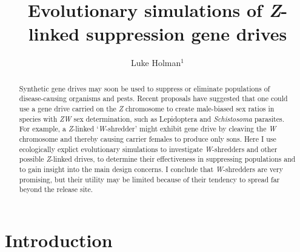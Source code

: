 \documentclass[]{rsos}%
\begin{document}
\title{Evolutionary simulations of \emph{Z}-linked suppression gene drives}

\author{
Luke Holman$^{1}$}

\address{
  $^{1}$School of BioSciences, The University of Melbourne, Victoria 3010,
Australia.}
\subject{
Evolutionary biology,
Theoretical modelling,
Gene drives}



\begin{abstract}
Synthetic gene drives may soon be used to suppress or eliminate
populations of disease-causing organisms and pests. Recent proposals
have suggested that one could use a gene drive carried on the \emph{Z}
chromosome to create male-biased sex ratios in species with \emph{ZW}
sex determination, such as Lepidoptera and \emph{Schistosoma} parasites.
For example, a \emph{Z}-linked `\emph{W}-shredder' might exhibit gene
drive by cleaving the \emph{W} chromosome and thereby causing carrier
females to produce only sons. Here I use ecologically explict
evolutionary simulations to investigate \emph{W}-shredders and other
possible \emph{Z}-linked drives, to determine their effectiveness in
suppressing populations and to gain insight into the main design
concerns. I conclude that \emph{W}-shredders are very promising, but
their utility may be limited because of their tendency to spread far
beyond the release site.
\end{abstract}

\providecommand{\tightlist}{%
  \setlength{\itemsep}{0pt}\setlength{\parskip}{0pt}}
\providecommand{\EndFirstPage}{%
}

\maketitle

\hypertarget{introduction}{%
\section{Introduction}\label{introduction}}
\end{document}

